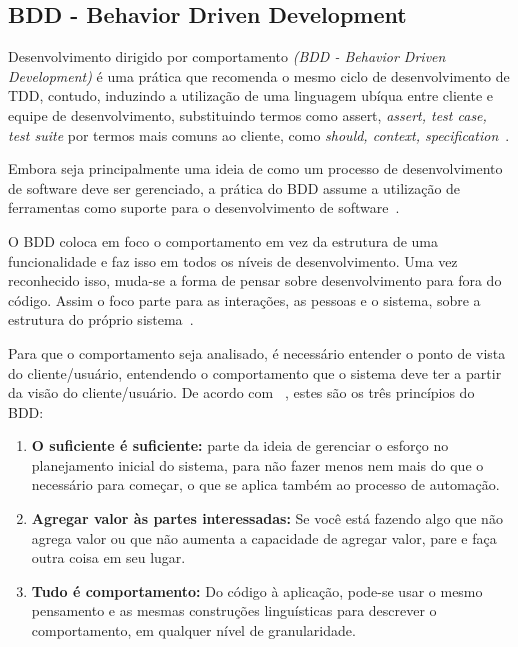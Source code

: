 \subsection{BDD - Behavior Driven Development}

Desenvolvimento dirigido por comportamento \textit{(BDD - Behavior Driven Development)} 
é uma prática que recomenda o mesmo ciclo de desenvolvimento de TDD, contudo, induzindo 
a utilização de uma linguagem ubíqua entre cliente e equipe de desenvolvimento, substituindo termos como assert, \textit{assert, test case, test suite} por termos 
mais comuns ao cliente, como \textit{should, context, specification}~\cite{bernardo2011}.

Embora seja principalmente uma ideia de como um processo de desenvolvimento de 
software deve ser gerenciado, a prática do BDD assume a utilização de ferramentas 
como suporte para o desenvolvimento de software~\cite{haring2011}. 

O BDD coloca em foco o comportamento em vez da estrutura de uma funcionalidade e faz isso em todos os níveis de desenvolvimento. Uma vez reconhecido isso, muda-se a forma de pensar sobre desenvolvimento para fora do código. Assim o foco parte para as interações, as pessoas e o sistema, sobre a 
estrutura do próprio sistema~\cite{chelimsky2010}.

Para que o comportamento seja analisado, é necessário entender o ponto de vista do 
cliente/usuário, entendendo o comportamento que o sistema deve ter a partir da
visão do cliente/usuário. 
%
De acordo com ~, estes são os três princípios do BDD:

\begin{enumerate}
\item \textbf{O suficiente é suficiente:} parte da ideia de gerenciar o esforço no 
planejamento inicial do sistema, para não fazer menos nem mais do que o necessário 
para começar, o que se aplica também ao processo de automação.

\item \textbf{Agregar valor às partes interessadas:} Se você está fazendo algo que 
não agrega valor ou que não aumenta a capacidade de agregar valor, pare e faça outra 
coisa em seu lugar.

\item \textbf{Tudo é comportamento:} Do código à aplicação, pode-se usar o mesmo 
pensamento e as mesmas construções linguísticas para descrever o comportamento, em 
qualquer nível de granularidade. 
\end{enumerate}

